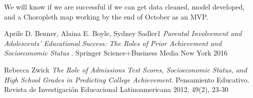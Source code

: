 \documentclass[sigconf,nonacm,11pt]{acmart}
\begin{document}
We will know if we are successful if we can get data cleaned, model developed, and a Choropleth map working by the end of October as an MVP.


\begin{thebibliography}{9}
Aprile D. Benner, Alaina E. Boyle, Sydney Sadler1
\textit{ Parental Involvement and Adolescents’ Educational Success: The Roles of Prior Achievement and Socioeconomic Status }. 
Springer Science+Business Media New York 2016

Rebecca Zwick 
\textit{	The Role of Admissions Test Scores, Socioeconomic Status, and High School Grades in Predicting College Achievement}. 
Pensamiento Educativo. Revista de Investigación Educacional Latinoamericana 2012, 49(2), 23-30






\appendix





\end{thebibliography}
\end{document}
